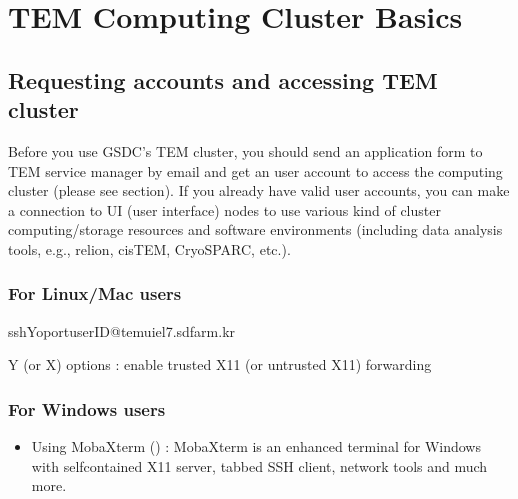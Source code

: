 \documentclass[a4paper,11pt,english]{sphinxmanual}
\begin{document}
\sphinxstepscope


\chapter{TEM Computing Cluster Basics}
\label{\detokenize{guide:tem-computing-cluster-basics}}\label{\detokenize{guide::doc}}

\section{Requesting accounts and accessing TEM cluster}
\label{\detokenize{guide:requesting-accounts-and-accessing-tem-cluster}}\label{\detokenize{guide:requesting-accounts}}
\sphinxAtStartPar
Before you use GSDC’s TEM cluster, you should send an application form to TEM service manager by e\sphinxhyphen{}mail and
get an user account to access the computing cluster (please see  section).
If you already have valid user accounts,
you can make a connection to UI (user interface) nodes to use various kind of cluster computing/storage resources and software environments (including data analysis tools, e.g., relion, cisTEM, CryoSPARC, etc.).


\subsection{For Linux/Mac users}
\label{\detokenize{guide:for-linux-mac-users}}
\begin{sphinxVerbatim}[commandchars=\\\{\}]
\PYGZdl{}\PYGZgt{}ssh\PYGZhy{}Y\PYGZhy{}o\PYGZlt{}port\PYGZgt{}\PYGZlt{}userID\PYGZgt{}@tem\PYGZhy{}ui\PYGZhy{}el7.sdfarm.kr
\end{sphinxVerbatim}

\sphinxAtStartPar
\sphinxhyphen{}Y (or \sphinxhyphen{}X) options : enable trusted X11 (or untrusted X11) forwarding


\subsection{For Windows users}
\label{\detokenize{guide:for-windows-users}}\begin{itemize}
\item {} 
\sphinxAtStartPar
Using MobaXterm () :
MobaXterm is an enhanced terminal for Windows with self\sphinxhyphen{}contained X11 server, tabbed SSH client, network tools and much more.

\end{itemize}
\end{document}
